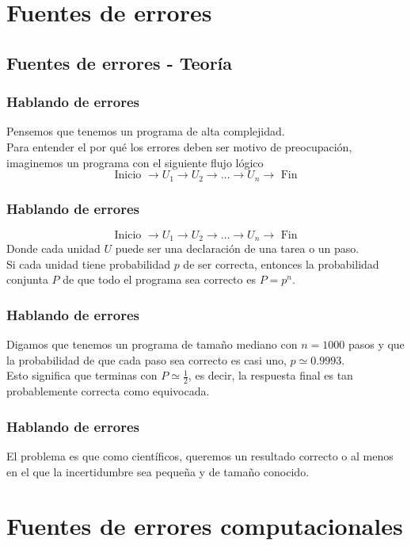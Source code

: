 \section{Fuentes de errores}
\subsection{Fuentes de errores - Teoría}
\begin{frame}
\frametitle{Hablando de errores}
Pensemos que tenemos un programa de alta complejidad.
\\
\bigskip
Para entender el por qué los errores deben ser motivo de preocupación, imaginemos un programa con el siguiente flujo lógico
\begin{equation}
\text{Inicio } \rightarrow U_{1} \rightarrow U_{2} \rightarrow \ldots \rightarrow U_{n} \rightarrow \text{ Fin} 
\label{eq:ecuacion_02_01}
\end{equation}
\end{frame}
\begin{frame}
\frametitle{Hablando de errores}
\begin{equation*}
\text{Inicio } \rightarrow U_{1} \rightarrow U_{2} \rightarrow \ldots \rightarrow U_{n} \rightarrow \text{ Fin} 
\end{equation*}
Donde cada unidad $U$ puede ser una declaración de una tarea o un paso.
\\
\bigskip
Si cada unidad tiene probabilidad $p$ de ser correcta, entonces la probabilidad conjunta $P$ de que todo el programa sea correcto es $P = p^{n}$.
\\
\end{frame}
\begin{frame}
\frametitle{Hablando de errores}
Digamos que tenemos un programa de tamaño mediano con $n = 1000$ pasos y que la probabilidad de que cada paso sea correcto es casi uno, $p \simeq 0.9993$.
\\
\bigskip
Esto significa que terminas con $P \simeq \frac{1}{2}$, es decir, la respuesta final es tan probablemente correcta como equivocada.
\end{frame}
\begin{frame}
\frametitle{Hablando de errores}
El problema es que como científicos, queremos un resultado correcto o al menos en el que la incertidumbre sea pequeña y de tamaño conocido.
\end{frame}
\section{Fuentes de errores computacionales}
